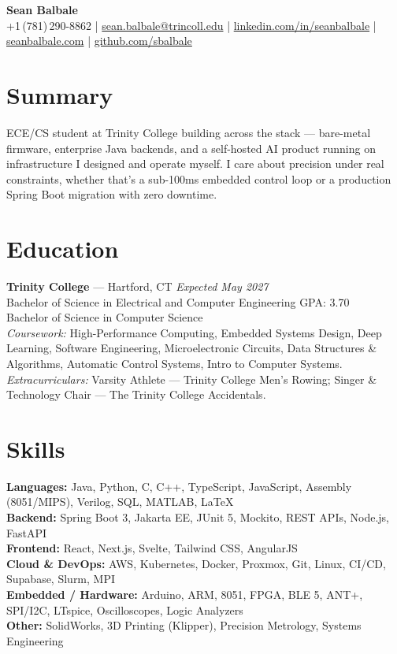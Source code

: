 \documentclass[10pt, letterpaper]{article}
\begin{document}
\small

\begin{center}
  {\Large \textbf{Sean Balbale}}\\[1pt]
  \small
  +1\,(781)\,290-8862 \;|\;
  \href{mailto:sean.balbale@trincoll.edu}{sean.balbale@trincoll.edu} \;|\;
  \href{https://www.linkedin.com/in/seanbalbale/}{linkedin.com/in/seanbalbale} \;|\;
  \href{https://seanbalbale.com}{seanbalbale.com} \;|\;
  \href{https://github.com/sbalbale}{github.com/sbalbale}
\end{center}

\section{Summary}

\noindent
ECE/CS student at Trinity College building across the stack — bare-metal firmware, enterprise
Java backends, and a self-hosted AI product running on infrastructure I designed and operate
myself. I care about precision under real constraints, whether that's a sub-100ms embedded
control loop or a production Spring Boot migration with zero downtime.

\section{Education}

\noindent
\textbf{Trinity College} --- Hartford, CT \hfill \textit{Expected May 2027}\\
Bachelor of Science in Electrical and Computer Engineering \hfill GPA: 3.70\\
Bachelor of Science in Computer Science\\
\textit{Coursework:} High-Performance Computing, Embedded Systems Design, Deep Learning,
Software Engineering, Microelectronic Circuits, Data Structures \& Algorithms,
Automatic Control Systems, Intro to Computer Systems.\\
\textit{Extracurriculars:} Varsity Athlete --- Trinity College Men's Rowing;\quad
Singer \& Technology Chair --- The Trinity College Accidentals.

\section{Skills}

\noindent
\textbf{Languages:} Java, Python, C, C++, TypeScript, JavaScript,
Assembly (8051/MIPS), Verilog, SQL, MATLAB, LaTeX\\
\textbf{Backend:} Spring Boot 3, Jakarta EE, JUnit 5, Mockito, REST APIs, Node.js, FastAPI\\
\textbf{Frontend:} React, Next.js, Svelte, Tailwind CSS, AngularJS\\
\textbf{Cloud \& DevOps:} AWS, Kubernetes, Docker, Proxmox, Git, Linux, CI/CD, Supabase, Slurm, MPI\\
\textbf{Embedded / Hardware:} Arduino, ARM, 8051, FPGA, BLE 5, ANT+, SPI/I2C, LTspice, Oscilloscopes, Logic Analyzers\\
\textbf{Other:} SolidWorks, 3D Printing (Klipper), Precision Metrology, Systems Engineering
\end{document}
